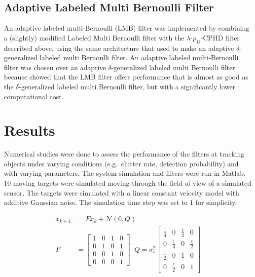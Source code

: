\documentclass{article}
\begin{document}
\subsection{Adaptive Labeled Multi Bernoulli Filter}
An adaptive labeled multi-Bernoulli (LMB) filter was implemented by combining a (slightly) modified Labeled Multi Bernoulli\cite{lmb} filter with the $\lambda$-$p_D$-CPHD filter described above, using the same architecture that \cite{adaptive_dglmb} used to make an adaptive $\delta$-generalized labeled multi Bernoulli filter. An adaptive labeled multi-Bernoulli filter was chosen over an adaptive $\delta$-generalized labeled multi Bernoulli filter because \cite{lmb} showed that the LMB filter offers performance that is almost as good as the $\delta$-generalized labeled multi Bernoulli filter, but with a significantly lower computational cost.

\section{Results}
Numerical studies were done to assess the performance of the filters at tracking objects under varying conditions (e.g.\ clutter rate, detection probability) and with varying parameters. The system simulation and filters were run in Matlab. 10 moving targets were simulated moving through the field of view of a simulated sensor. The targets were simulated with a linear constant velocity model with additive Gaussian noise. The simulation time step was set to $1$ for simplicity.

\begin{align}
  x_{k+1} &= Fx_k + \mathcal{N}(0, Q)\\
  F &=
  \begin{bmatrix}
    1 & 0 & 1 & 0\\
    0 & 1 & 0 & 1\\
    0 & 0 & 1 & 0\\
    0 & 0 & 0 & 1
  \end{bmatrix}\;\;
                Q
                = \sigma^2_v
  \begin{bmatrix}
    \frac{1}{4} & 0 & \frac{1}{2} & 0\\
    0 & \frac{1}{4} & 0 & \frac{1}{2}\\
     \frac{1}{2} & 0 & 1 & 0\\
    0 &  \frac{1}{2} & 0 & 1
  \end{bmatrix}\\           
\end{align}
\end{document}
